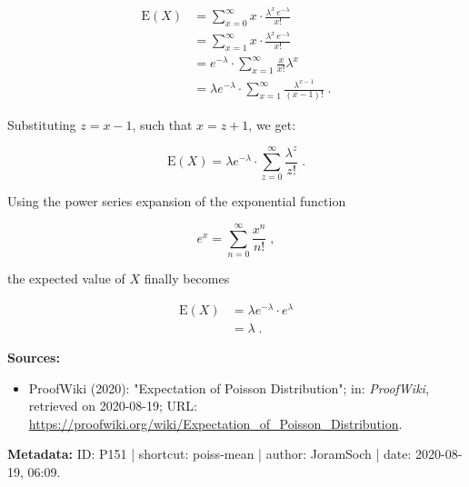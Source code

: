 \documentclass[a4paper,12pt,twoside]{book}
\begin{document}
\begin{equation} \label{eq:poiss-mean-poiss-mean-s1}
\begin{split}
\mathrm{E}(X) &= \sum_{x=0}^\infty x \cdot \frac{\lambda^x \, e^{-\lambda}}{x!} \\
&= \sum_{x=1}^\infty x \cdot \frac{\lambda^x \, e^{-\lambda}}{x!} \\
&= e^{-\lambda} \cdot \sum_{x=1}^\infty \frac{x}{x!} \lambda^x \\
&= \lambda e^{-\lambda} \cdot \sum_{x=1}^\infty \frac{\lambda^{x-1}}{(x-1)!} \; .
\end{split}
\end{equation}

Substituting $z = x-1$, such that $x = z+1$, we get:

\begin{equation} \label{eq:poiss-mean-poiss-mean-s2}
\mathrm{E}(X) = \lambda e^{-\lambda} \cdot \sum_{z=0}^\infty \frac{\lambda^z}{z!} \; .
\end{equation}

Using the power series expansion of the exponential function

\begin{equation} \label{eq:poiss-mean-exp-ps}
e^x = \sum_{n=0}^\infty \frac{x^n}{n!} \; ,
\end{equation}

the expected value of $X$ finally becomes

\begin{equation} \label{eq:poiss-mean-poiss-mean-s3}
\begin{split}
\mathrm{E}(X) &= \lambda e^{-\lambda} \cdot e^{\lambda} \\
&= \lambda \; .
\end{split}
\end{equation}


\vspace{1em}
\textbf{Sources:}
\begin{itemize}
\item ProofWiki (2020): "Expectation of Poisson Distribution"; in: \textit{ProofWiki}, retrieved on 2020-08-19; URL: \url{https://proofwiki.org/wiki/Expectation_of_Poisson_Distribution}.
\end{itemize}


\vspace{1em}
\textbf{Metadata:} ID: P151 | shortcut: poiss-mean | author: JoramSoch | date: 2020-08-19, 06:09.
\vspace{1em}
\end{document}
